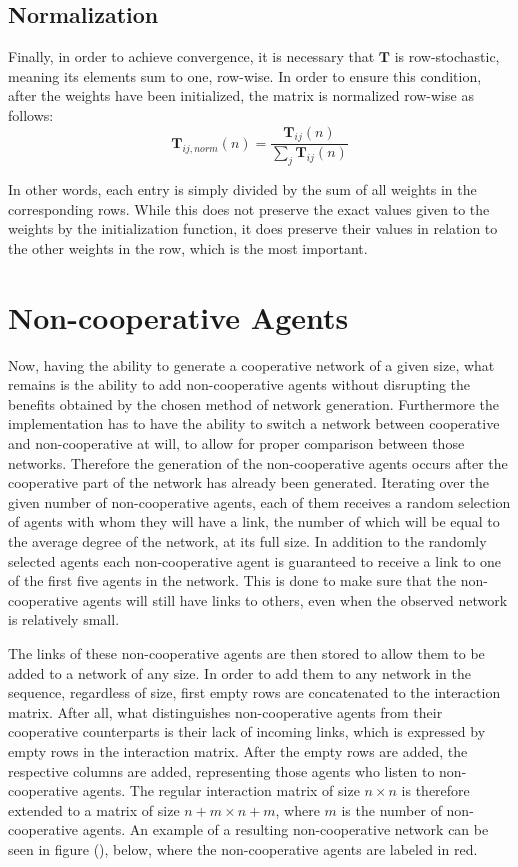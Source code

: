 \documentclass{article}
\newcommand{\T}{\textbf{T}}
\begin{document}
\subsection{Normalization}

Finally, in order to achieve convergence, it is necessary that $\T$ is row-stochastic, meaning its elements sum to one, row-wise. In order to ensure this condition, after the weights have been initialized, the matrix is normalized row-wise as follows:
\begin{equation}
    \T_{ij, norm}(n) = \frac{\T_{ij}(n)}{\sum_{j}\T_{ij}(n)}
\end{equation}

In other words, each entry is simply divided by the sum of all weights in the corresponding rows. While this does not preserve the exact values given to the weights by the initialization function, it does preserve their values in relation to the other weights in the row, which is the most important.

\newpage

\section{Non-cooperative Agents}

Now, having the ability to generate a cooperative network of a given size, what remains is the ability to add non-cooperative agents without disrupting the benefits obtained by the chosen method of network generation.
Furthermore the implementation has to have the ability to switch a network between cooperative and non-cooperative at will, to allow for proper comparison between those networks.
Therefore the generation of the non-cooperative agents occurs after the cooperative part of the network has already been generated. Iterating over the given number of non-cooperative agents, each of them receives a random selection of agents with whom they will have a link, the number of which will be equal to the average degree of the network, at its full size.
In addition to the randomly selected agents each non-cooperative agent is guaranteed to receive a link to one of the first five agents in the network. This is done to make sure that the non-cooperative agents will still have links to others, even when the observed network is relatively small.

The links of these non-cooperative agents are then stored to allow them to be added to a network of any size. In order to add them to any network in the sequence, regardless of size, first empty rows are concatenated to the interaction matrix. After all, what distinguishes non-cooperative agents from their cooperative counterparts is their lack of incoming links, which is expressed by empty rows in the interaction matrix. After the empty rows are added, the respective columns are added, representing those agents who listen to non-cooperative agents. The regular interaction matrix of size $n \times n$ is therefore extended to a matrix of size $n+m \times n+m$, where $m$ is the number of non-cooperative agents.
An example of a resulting non-cooperative network can be seen in figure (), below, where the non-cooperative agents are labeled in red.
\end{document}
